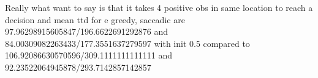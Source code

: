 Really what want to say is that it takes 4 positive obs in same location to reach a decision and mean ttd for e greedy, saccadic are 97.96298915605847/196.6622691292876 and 84.00309082263433/177.3551637279597 with init 0.5 compared to 106.92086630570596/309.1111111111111 and 92.23522064945878/293.7142857142857









